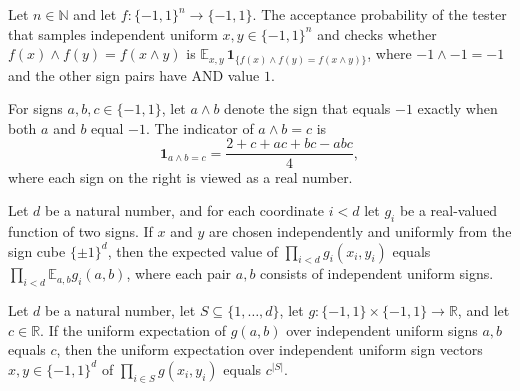 \begin{theorem}
\label{FABL.signAndFunctionTester_acceptanceProbability}
\leanok
{}
Let $n\in\mathbb{N}$ and let $f:\{-1,1\}^n\to\{-1,1\}$. The acceptance probability of
the tester that samples independent uniform $x,y\in\{-1,1\}^n$ and checks whether
$f(x)\wedge f(y)=f(x\wedge y)$ is $\mathbb{E}_{x,y}\,\mathbf{1}_{\{f(x)\wedge
f(y)=f(x\wedge y)\}}$, where $-1\wedge-1=-1$ and the other sign pairs have AND value
$1$.
\end{theorem}

\begin{theorem}
\label{FABL.signAnd_indicator}
\leanok
{}
For signs $a,b,c\in\{−1,1\}$, let $a\wedge b$ denote the sign that equals $-1$ exactly
when both $a$ and $b$ equal $-1$. The indicator of $a\wedge b=c$ is
\[\mathbf{1}_{a\wedge b=c}=\frac{2+c+ac+bc-abc}{4},\]
where each sign on the right is viewed as a real number.
\end{theorem}

\begin{theorem}
\label{FABL.expect_pair_prod_finArrow}
\leanok
{}
Let $d$ be a natural number, and for each coordinate $i<d$ let $g_i$ be a real-valued
function of two signs. If $x$ and $y$ are chosen independently and uniformly from the
sign cube $\{\pm1\}^d$, then the expected value of $\prod_{i<d}g_i(x_i,y_i)$ equals
$\prod_{i<d}\mathbb E_{a,b}g_i(a,b)$, where each pair $a,b$ consists of independent
uniform signs.
\end{theorem}

\begin{theorem}
\label{FABL.expect_subset_pair_product}
\leanok
{}
Let $d$ be a natural number, let $S\subseteq\{1,\ldots,d\}$, let
$g\colon\{-1,1\}\times\{-1,1\}\to\mathbb{R}$, and let $c\in\mathbb{R}$. If the uniform
expectation of $g(a,b)$ over independent uniform signs $a,b$ equals $c$, then the
uniform expectation over independent uniform sign vectors $x,y\in\{-1,1\}^d$ of
$\prod_{i\in S}g(x_i,y_i)$ equals $c^{|S|}$.
\end{theorem}

